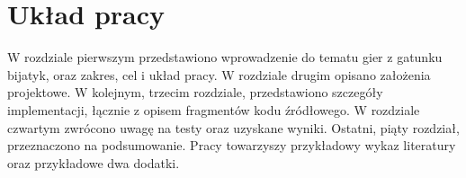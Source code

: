 \section{Układ pracy}
W rozdziale pierwszym przedstawiono wprowadzenie do tematu gier z gatunku bijatyk, oraz zakres, cel i układ pracy.
W rozdziale drugim opisano założenia projektowe.
W kolejnym, trzecim rozdziale, przedstawiono szczegóły implementacji, łącznie z opisem fragmentów kodu źródłowego.
W rozdziale czwartym zwrócono uwagę na testy oraz uzyskane wyniki.
Ostatni, piąty rozdział, przeznaczono na podsumowanie.
Pracy towarzyszy przykładowy wykaz literatury oraz przykładowe dwa dodatki. 

